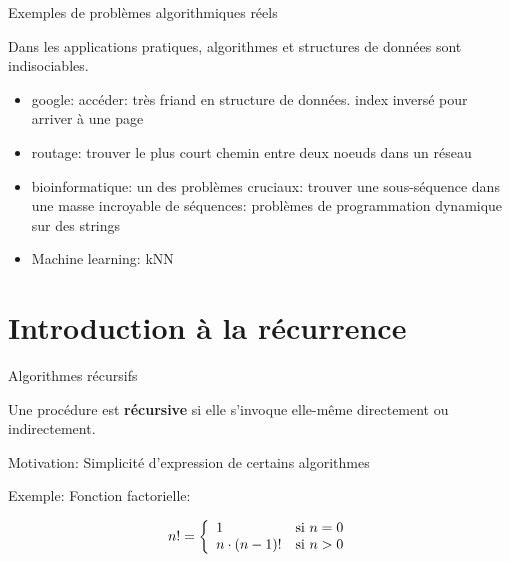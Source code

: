 \begin{frame}{Exemples de problèmes algorithmiques réels}

Dans les applications pratiques, algorithmes et structures de données sont indisociables.
\begin{itemize}
\item google: accéder: très friand en structure de données. index inversé pour arriver à une page
\item routage: trouver le plus court chemin entre deux noeuds dans un réseau
\item bioinformatique: un des problèmes cruciaux: trouver une sous-séquence dans une masse incroyable de séquences: problèmes de programmation dynamique sur des strings
\item Machine learning: kNN 
\end{itemize}

\end{frame}

\section{Introduction à la récurrence}



\begin{frame}{Algorithmes récursifs}

Une procédure est {\bf récursive} si elle s'invoque elle-même
directement ou indirectement.

\bigskip

Motivation: Simplicité d'expression de certains algorithmes

\bigskip

Exemple: Fonction factorielle:

\[n!=\left\{\begin{array}{ll}
1 &\mbox{si }n=0\\
n \cdot (n-1)! &\mbox{si }n>0$$
\end{array}
\right.
\]

\begin{center}
\end{center}

\end{frame}

